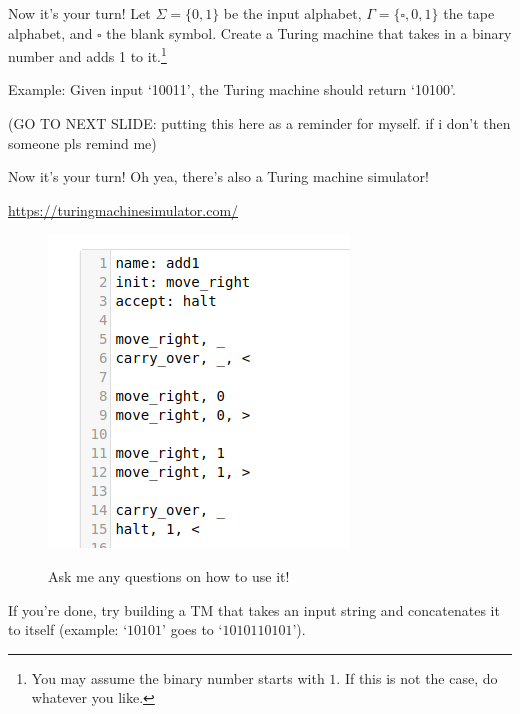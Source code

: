 \documentclass{beamer}
\begin{document}
\begin{frame}{Now it's your turn!}
Let $\Sigma = \{0, 1\}$ be the input alphabet, $\Gamma = \{\square, 0, 1\}$ the tape alphabet, and $\square$ the blank symbol. Create a Turing machine that takes in a binary number and adds 1 to it.\footnote{You may assume the binary number starts with $1$. If this is not the case, do whatever you like.}

\vspace{2mm}

Example: Given input `10011', the Turing machine should return `10100'.

\begin{center}
\end{center}

\color{red}(GO TO NEXT SLIDE: putting this here as a reminder for myself. if i don't then someone pls remind me)
\end{frame}

\begin{frame}{Now it's your turn!}
Oh yea, there's also a Turing machine simulator!

\url{https://turingmachinesimulator.com/}

\begin{figure}[h]
\includegraphics[scale=0.4]{img/ss1.png}

Ask me any questions on how to use it!
\end{figure}

If you're done, try building a TM that takes an input string and concatenates it to itself (example: `$10101$' goes to `$1010110101$').
\end{frame}
\end{document}
